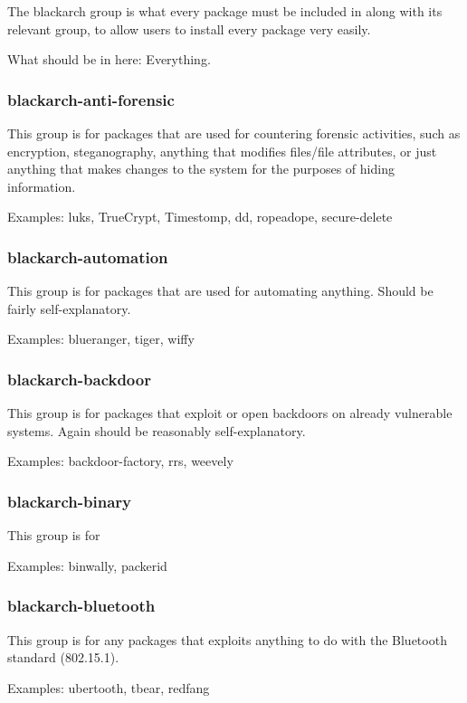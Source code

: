 \documentclass[a4paper, oneside, 11pt]{book}
\begin{document}
The blackarch group is what every package must be included in along with its relevant group, to allow users to install every package very easily.

What should be in here: Everything.

\subsubsection{blackarch-anti-forensic}

This group is for packages that are used for countering forensic activities, such as encryption, steganography, anything that modifies files/file attributes, or just anything that makes changes to the system for the purposes of hiding information.

Examples: luks, TrueCrypt, Timestomp, dd, ropeadope, secure-delete

\subsubsection{blackarch-automation}

This group is for packages that are used for automating anything. Should be fairly self-explanatory.

Examples: blueranger, tiger, wiffy

\subsubsection{blackarch-backdoor}

This group is for packages that exploit or open backdoors on already vulnerable systems. Again should be reasonably self-explanatory.

Examples: backdoor-factory, rrs, weevely

\subsubsection{blackarch-binary}

This group is for 

Examples: binwally, packerid

\subsubsection{blackarch-bluetooth}

This group is for any packages that exploits anything to do with the Bluetooth standard (802.15.1).

Examples: ubertooth, tbear, redfang
\end{document}
